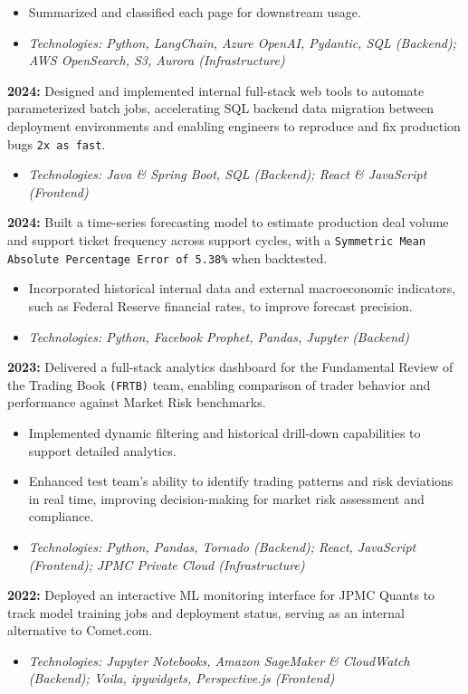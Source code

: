 \begin{cventries}
{\begin{cvitems}
{\begin{itemize}
       \item Summarized and classified each page for downstream usage. 
       \item \textit{Technologies: Python, LangChain, Azure OpenAI, Pydantic, SQL (Backend); AWS OpenSearch, S3, Aurora (Infrastructure)}
       \end{itemize}
       }
       \item{ \textbf{2024:} Designed and implemented internal full-stack web tools to automate parameterized batch jobs, accelerating SQL backend data migration between deployment environments and enabling engineers to reproduce and fix production bugs \texttt{2x as fast}.
        \begin{itemize}
            \item \textit{Technologies: Java \& Spring Boot, SQL (Backend); React \& JavaScript (Frontend)}
        \end{itemize}
        }
        \item{ \textbf{2024:} Built a time-series forecasting model to estimate production deal volume and support ticket frequency across support cycles, with a \texttt{Symmetric Mean Absolute Percentage Error of 5.38\%} when backtested.
        \begin{itemize}
        \item Incorporated historical internal data and external macroeconomic indicators, such as Federal Reserve financial rates, to improve forecast precision.
        \item \textit{Technologies: Python, Facebook Prophet, Pandas, Jupyter (Backend)}
        \end{itemize}
        }
        \item { \textbf{2023:} Delivered a full-stack analytics dashboard for the Fundamental Review of the Trading Book \texttt{(FRTB)} team, enabling comparison of trader behavior and performance against Market Risk benchmarks.
        \begin{itemize}
        \item Implemented dynamic filtering and historical drill-down capabilities to support detailed analytics.
        \item Enhanced test team’s ability to identify trading patterns and risk deviations in real time, improving decision-making for market risk assessment and compliance.
        \item \textit{Technologies: Python, Pandas, Tornado (Backend); React, JavaScript (Frontend); JPMC Private Cloud (Infrastructure)} 
        \end{itemize}
        }
        \item{
        \textbf{2022:} Deployed an interactive ML monitoring interface for JPMC Quants to track model training jobs and deployment status, serving as an internal alternative to Comet.com.
        \begin{itemize}
        \item \textit{Technologies: Jupyter Notebooks, Amazon SageMaker \& CloudWatch (Backend); Voila, ipywidgets, Perspective.js (Frontend)}
        \end{itemize}
        }
      \end{cvitems}
    }


\end{cventries}

